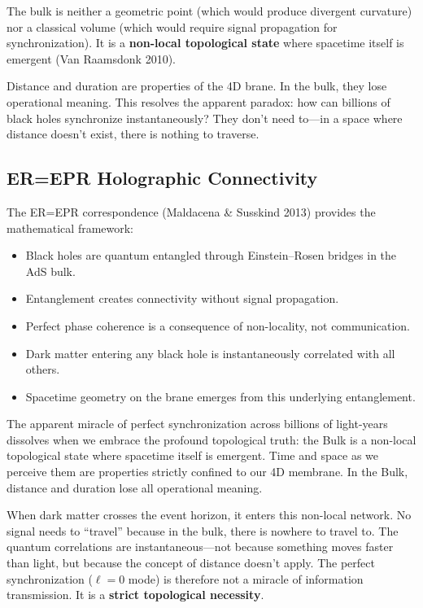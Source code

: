 The bulk is neither a geometric point (which would produce divergent curvature) nor a classical volume (which would require signal propagation for synchronization). It is a \textbf{non-local topological state} where spacetime itself is emergent (Van Raamsdonk 2010).

Distance and duration are properties of the 4D brane. In the bulk, they lose operational meaning. This resolves the apparent paradox: how can billions of black holes synchronize instantaneously? They don't need to---in a space where distance doesn't exist, there is nothing to traverse.

\subsection{ER=EPR Holographic Connectivity}

The ER=EPR correspondence (Maldacena \& Susskind 2013) provides the mathematical framework:

\begin{itemize}
  \item Black holes are quantum entangled through Einstein--Rosen bridges in the AdS bulk.
  \item Entanglement creates connectivity without signal propagation.
  \item Perfect phase coherence is a consequence of non-locality, not communication.
  \item Dark matter entering any black hole is instantaneously correlated with all others.
  \item Spacetime geometry on the brane emerges from this underlying entanglement.
\end{itemize}

The apparent miracle of perfect synchronization across billions of light-years dissolves when we embrace the profound topological truth: the Bulk is a non-local topological state where spacetime itself is emergent. Time and space as we perceive them are properties strictly confined to our 4D membrane. In the Bulk, distance and duration lose all operational meaning.

When dark matter crosses the event horizon, it enters this non-local network. No signal needs to ``travel'' because in the bulk, there is nowhere to travel to. The quantum correlations are instantaneous---not because something moves faster than light, but because the concept of distance doesn't apply. The perfect synchronization ($\ell = 0$ mode) is therefore not a miracle of information transmission. It is a \textbf{strict topological necessity}.

